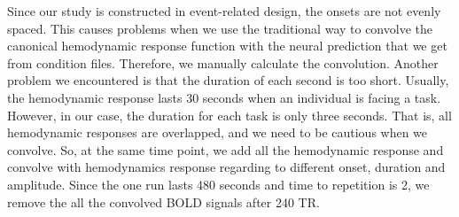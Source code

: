 \par \indent Since our study is constructed in event-related design, the onsets
are not evenly spaced. This causes problems when we use the traditional way to
convolve the canonical hemodynamic response function with the neural
prediction that we get from condition files. Therefore, we manually calculate
the convolution. Another problem we encountered is that the duration of each
second is too short. Usually, the hemodynamic response lasts 30 seconds when
an individual is facing a task. However, in our case, the duration for each
task is only three seconds. That is, all hemodynamic responses are overlapped,
and we need to be cautious when we convolve. So, at the same time point, we add
all the hemodynamic response and convolve with hemodynamics response regarding
to different onset, duration and amplitude. Since the one run lasts 480
seconds and time to repetition is 2, we remove the all the convolved BOLD
signals after 240 TR. 

